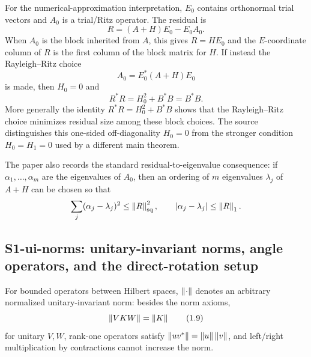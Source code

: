 For the numerical-approximation interpretation, $E_0$ contains orthonormal trial vectors and $A_0$ is a trial/Ritz operator.  The residual is
\begin{equation}
 R=(A+H)E_0-E_0A_0.
 \tag{1.8}
\end{equation}
When $A_0$ is the block inherited from $A$, this gives $R=HE_0$ and the $E$-coordinate column of $R$ is the first column of the block matrix for $H$.  If instead the Rayleigh--Ritz choice
\[
 A_0=E_0^*(A+H)E_0
\]
is made, then $H_0=0$ and
\[
 R^*R=H_0^2+B^*B=B^*B.
\]
More generally the identity $R^*R=H_0^2+B^*B$ shows that the Rayleigh--Ritz choice minimizes residual size among these block choices.  The source distinguishes this one-sided off-diagonality $H_0=0$ from the stronger condition $H_0=H_1=0$ used by a different main theorem.

The paper also records the standard residual-to-eigenvalue consequence: if $\alpha_1,\ldots,\alpha_m$ are the eigenvalues of $A_0$, then an ordering of $m$ eigenvalues $\lambda_j$ of $A+H$ can be chosen so that
\[
 \sum_j(\alpha_j-\lambda_j)^2\le \left\lVert R\right\rVert_{\mathrm{sq}}^2,
 \qquad
 |\alpha_j-\lambda_j|\le \left\lVert R\right\rVert_1.
\]

\subsection*{S1-ui-norms: unitary-invariant norms, angle operators, and the direct-rotation setup}
For bounded operators between Hilbert spaces, $\left\lVert \cdot\right\rVert$ denotes an arbitrary normalized unitary-invariant norm: besides the norm axioms,
\begin{equation}
 \left\lVert VKW\right\rVert=\left\lVert K\right\rVert
 \tag{1.9}
\end{equation}
for unitary $V,W$, rank-one operators satisfy $\left\lVert uv^*\right\rVert=\left\lVert u\right\rVert\left\lVert v\right\rVert$, and left/right multiplication by contractions cannot increase the norm.

